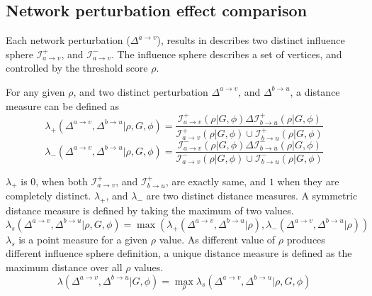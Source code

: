 \documentclass{article}
\begin{document}
\subsection{Network perturbation effect comparison}
Each network perturbation ($\Delta^{a\rightarrow v}$), results in describes two distinct influence sphere $\mathcal{I}^{+}_{a\rightarrow v}$, and $\mathcal{I}^{-}_{a\rightarrow v}$. The influence sphere describes a set of vertices, and controlled by the threshold score $\rho$.
\par
For any given $\rho$, and two distinct perturbation $\Delta^{a\rightarrow v}$, and $\Delta^{b\rightarrow u}$, a distance measure can be defined as 
\begin{equation*}
    \lambda_{+}( \Delta^{a\rightarrow v}, \Delta^{b\rightarrow u} \vert \rho, G, \phi) = \dfrac{\mathcal{I}^{+}_{a\rightarrow v}(\rho \vert G, \phi) \Delta \mathcal{I}^{+}_{b\rightarrow u}(\rho \vert G, \phi)}{\mathcal{I}^{+}_{a\rightarrow v}(\rho \vert G, \phi) \cup \mathcal{I}^{+}_{b\rightarrow u}(\rho \vert G, \phi)}
\end{equation*}
\begin{equation*}
    \lambda_{-}( \Delta^{a\rightarrow v}, \Delta^{b\rightarrow u} \vert \rho, G, \phi) = \dfrac{\mathcal{I}^{-}_{a\rightarrow v}(\rho \vert G, \phi) \Delta \mathcal{I}^{-}_{b\rightarrow u}(\rho \vert G, \phi)}{\mathcal{I}^{-}_{a\rightarrow v}(\rho \vert G, \phi) \cup \mathcal{I}^{-}_{b\rightarrow u}(\rho \vert G, \phi)}
\end{equation*}

$\lambda_{+}$ is $0$, when both $\mathcal{I}^{+}_{a\rightarrow v}$, and $\mathcal{I}^{+}_{b\rightarrow u}$, are exactly same, and $1$ when they are completely distinct. $\lambda_{+}$, and $\lambda_{-}$ are two distinct distance measures. A symmetric distance measure is defined by taking the maximum of two values.
\begin{equation*}
    \lambda_{s}(\Delta^{a\rightarrow v}, \Delta^{b\rightarrow u}\vert \rho, G, \phi) = \max (\lambda_{+}( \Delta^{a\rightarrow v}, \Delta^{b\rightarrow u} \vert \rho) , \lambda_{-}( \Delta^{a\rightarrow v}, \Delta^{b\rightarrow u} \vert \rho) )
\end{equation*}
$\lambda_{s}$ is a point measure for a given $\rho$ value. As different value of $\rho$ produces different influence sphere definition, a unique distance measure is defined as the maximum distance over all $\rho$ values.
\begin{equation*}
    \lambda(\Delta^{a\rightarrow v}, \Delta^{b\rightarrow u}\vert G,\phi) = \max_{\rho} \lambda_{s}(\Delta^{a\rightarrow v}, \Delta^{b\rightarrow u}\vert \rho, G, \phi)
\end{equation*}
\end{document}
